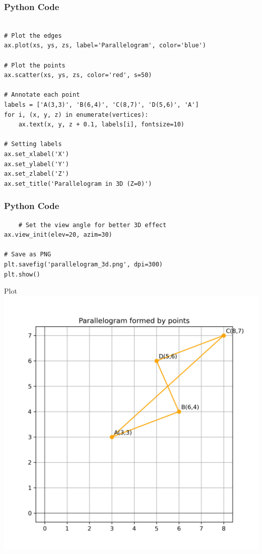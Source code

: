 \documentclass{beamer}
\begin{document}
\begin{frame}[fragile]
    \frametitle{Python Code }
    \begin{lstlisting}
    
# Plot the edges
ax.plot(xs, ys, zs, label='Parallelogram', color='blue')

# Plot the points
ax.scatter(xs, ys, zs, color='red', s=50)

# Annotate each point
labels = ['A(3,3)', 'B(6,4)', 'C(8,7)', 'D(5,6)', 'A']
for i, (x, y, z) in enumerate(vertices):
    ax.text(x, y, z + 0.1, labels[i], fontsize=10)

# Setting labels
ax.set_xlabel('X')
ax.set_ylabel('Y')
ax.set_zlabel('Z')
ax.set_title('Parallelogram in 3D (Z=0)')
     \end{lstlisting}

\end{frame}
\begin{frame}[fragile]
    \frametitle{Python Code }
    \begin{lstlisting}
    # Set the view angle for better 3D effect
ax.view_init(elev=20, azim=30)

# Save as PNG
plt.savefig('parallelogram_3d.png', dpi=300)
plt.show()
   \end{lstlisting}

\end{frame}
\begin{frame}{Plot}
    \centering
    \includegraphics[width=\columnwidth, height=0.8\textheight, keepaspectratio]{Figs/IMG-20250829-WA0000.jpg}     
\end{frame}
\end{document}
